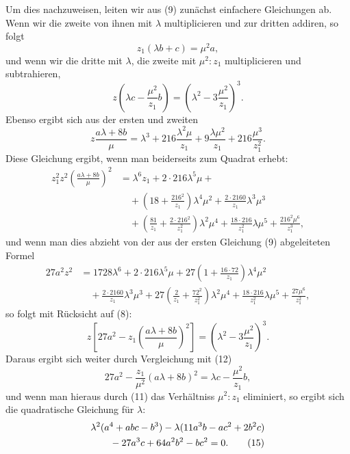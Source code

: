 \documentclass[11pt]{article}
\begin{document}
Um dies nachzuweisen, leiten wir aus (9) zunächst einfachere Gleichungen ab. Wenn wir die zweite von ihnen mit \(\lambda\) multiplicieren und zur dritten addiren, so folgt
\begin{equation}
z_1(\lambda b+c)=\mu^2a,
\tag{11}
\end{equation}
und wenn wir die dritte mit \(\lambda\), die zweite mit \(\mu^2:z_1\) multiplicieren und subtrahieren,
\begin{equation}
z\left(\lambda c-\frac{\mu^2}{z_1}b\right)=\left(\lambda^2-3\frac{\mu^2}{z_1}\right)^3.
\tag{12}
\end{equation}
Ebenso ergibt sich aus der ersten und zweiten
\[
z\frac{a\lambda+8b}{\mu}=\lambda^3+216\frac{\lambda^2\mu}{z_1}+9\frac{\lambda\mu^2}{z_1}+216\frac{\mu^3}{z_1^2}.
\]
Diese Gleichung ergibt, wenn man beiderseits zum Quadrat erhebt:
\begin{align*}
z_1^2z^2\left(\frac{a\lambda+8b}{\mu}\right)^2
&=\lambda^6z_1+2\cdot216\lambda^5\mu+\\[-0.3em]
&\quad+\left(18+\frac{216^2}{z_1}\right)\lambda^4\mu^2+\frac{2\cdot2160}{z_1}\lambda^3\mu^3\\
&\quad+\left(\frac{81}{z_1}+\frac{2\cdot216^2}{z_1^2}\right)\lambda^2\mu^4
+\frac{18\cdot216}{z_1^2}\lambda\mu^5+
\frac{216^2\mu^6}{z_1^3},
\end{align*}
und wenn man dies abzieht von der aus der ersten Gleichung (9) abgeleiteten Formel
\begin{align*}
27a^2z^2&=1728\lambda^6+2\cdot216\lambda^5\mu+27\left(1+\frac{16\cdot72}{z_1}\right)\lambda^4\mu^2\\
&\quad+\frac{2\cdot2160}{z_1}\lambda^3\mu^3
+27\left(\frac{2}{z_1}+\frac{72^2}{z_1^2}\right)\lambda^2\mu^4
+\frac{18\cdot216}{z_1^2}\lambda\mu^5
+\frac{27\mu^6}{z_1^2},
\end{align*}
so folgt mit Rücksicht auf (8):
\begin{equation}
z\left[27a^2-z_1\left(\frac{a\lambda+8b}{\mu}\right)^2\right]=\left(\lambda^2-3\frac{\mu^2}{z_1}\right)^3.
\tag{13}
\end{equation}
Daraus ergibt sich weiter durch Vergleichung mit (12)
\begin{equation}
27a^2-\frac{z_1}{\mu^2}(a\lambda+8b)^2=\lambda c-\frac{\mu^2}{z_1}b,
\tag{14}
\end{equation}
und wenn man hieraus durch (11) das Verhältniss \(\mu^2:z_1\) eliminiert, so ergibt sich die quadratische Gleichung für \(\lambda\):
\begin{align}
&\lambda^2(a^4+abc-b^3)-\lambda(11a^3b-ac^2+2b^2c)\notag\\
&\qquad -27a^3c+64a^2b^2-bc^2=0.
\tag{15}
\end{align}
\end{document}
